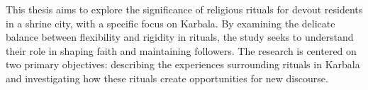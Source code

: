 This thesis aims to explore the significance of religious rituals for devout residents in a shrine city, with a specific focus on Karbala. By examining the delicate balance between flexibility and rigidity in rituals, the study seeks to understand their role in shaping faith and maintaining followers. The research is centered on two primary objectives: describing the experiences surrounding rituals in Karbala and investigating how these rituals create opportunities for new discourse.

